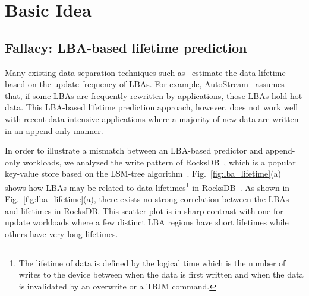 \section{Basic Idea}
\subsection{Fallacy: LBA-based lifetime prediction}
Many existing data separation techniques such as~\cite{AutoStream, HotCold} 
estimate the data lifetime based on the update frequency of LBAs.  
For example, \textsf{\small AutoStream}~\cite{AutoStream} assumes that, if
some LBAs are frequently rewritten by applications, those LBAs hold hot data.
This LBA-based lifetime prediction 
approach, however, does not work well with recent data-intensive 
applications where a majority of
new data are written in an append-only manner.  



In order to illustrate a mismatch between an LBA-based predictor and 
append-only workloads, we analyzed the write pattern of 
RocksDB~\cite{RocksDB}, which is a
popular key-value store based on the LSM-tree algorithm~\cite{LSM}.
Fig.~\ref{fig:lba_lifetime}(a) shows how LBAs may be related 
to data lifetimes\footnote{The lifetime of data is defined 
by the logical time which is the number of writes to the device 
between when the data is first written 
and when the data is invalidated by an overwrite or a TRIM command.}
in RocksDB~\cite{RocksDB}.  
As shown in Fig.~\ref{fig:lba_lifetime}(a), 
there exists no strong correlation between the LBAs and lifetimes in RocksDB.  
This scatter plot is in sharp contrast with one for update workloads 
where a few distinct LBA regions have short lifetimes while others 
have very long lifetimes.

